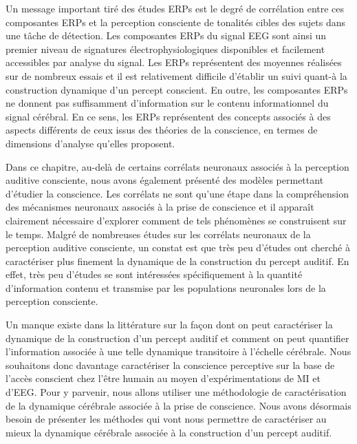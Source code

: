 Un message important tiré des études ERPs est le degré de corrélation entre ces composantes ERPs et la perception consciente de tonalités cibles des sujets dans une tâche de détection. 
Les composantes ERPs du signal EEG sont ainsi un premier niveau de signatures électrophysiologiques disponibles et facilement accessibles par analyse du signal. 
Les ERPs représentent des moyennes réalisées sur de nombreux essais et il est relativement difficile d'établir un suivi quant-à la construction dynamique d'un percept conscient. 
En outre, les composantes ERPs ne donnent pas suffisamment d'information sur le contenu informationnel du signal cérébral. 
En ce sens, les ERPs représentent des concepts associés à des aspects différents de ceux issus des théories de la conscience, en termes de dimensions d'analyse qu'elles proposent. 

Dans ce chapitre, au-delà de certains corrélats neuronaux associés à la perception auditive consciente, nous avons également présenté des modèles permettant d'étudier la conscience. 
Les corrélats ne sont qu'une étape dans la compréhension des mécanismes neuronaux associés à la prise de conscience et il apparaît clairement nécessaire d'explorer comment de tels phénomènes se construisent sur le temps. 
Malgré de nombreuses études sur les corrélats neuronaux de la perception auditive consciente, un constat est que très peu d'études ont cherché à caractériser plus finement la dynamique de la construction du percept auditif. 
En effet, très peu d'études se sont intéressées spécifiquement à la quantité d'information contenu et transmise par les populations neuronales lors de la perception consciente. 

Un manque existe dans la littérature sur la façon dont on peut caractériser la dynamique de la construction d'un percept auditif et comment on peut quantifier l'information associée à une telle dynamique transitoire à l'échelle cérébrale. 
Nous souhaitons donc davantage caractériser la conscience perceptive sur la base de l'accès conscient chez l'être humain au moyen d'expérimentations de MI et d'EEG. 
Pour y parvenir, nous allons utiliser une méthodologie de caractérisation de la dynamique cérébrale associée à la prise de conscience. 
Nous avons désormais besoin de présenter les méthodes qui vont nous permettre de caractériser au mieux la dynamique cérébrale associée à la construction d'un percept auditif.

\clearpage\null\newpage
